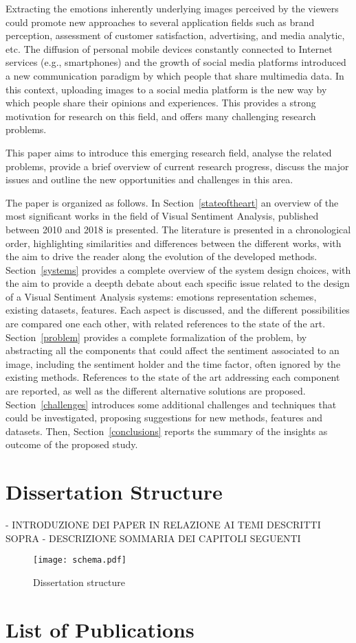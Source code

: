 Extracting the emotions inherently underlying images perceived by the viewers could promote new approaches to several application fields such as brand perception, assessment of customer satisfaction, advertising, and media analytic, etc.
The diffusion of personal mobile devices constantly connected to Internet services (e.g., smartphones) and the growth of social media platforms introduced a new communication paradigm by which people that share multimedia data. %
In this context, uploading images to a social media platform is the new way by which people share their opinions and experiences.  
This provides a strong motivation for research on this field, and offers many challenging research problems.

This paper aims to introduce this emerging research field, analyse the related problems, provide a brief overview of current research progress, discuss the major issues and outline the new opportunities and challenges in this area.


The paper is organized as follows. In Section~\ref{stateoftheart} an overview of the most significant works in the field of Visual Sentiment Analysis, published between 2010 and 2018 is presented. The literature is presented in a chronological order, highlighting similarities and differences between the different works, with the aim to drive the reader along the evolution of the developed methods.
Section~\ref{systems} provides a complete overview of the system design choices, with the aim to provide a deepth debate about each specific issue related to the design of a Visual Sentiment Analysis systems: emotions representation schemes, existing datasets, features. Each aspect is discussed, and the different possibilities are compared one each other, with related references to the state of the art.
Section~\ref{problem} provides a complete formalization of the problem, by abstracting all the components that could affect the sentiment associated to an image, including the sentiment holder and the time factor, often ignored by the existing methods. References to the state of the art addressing each component are reported, as well as the different alternative solutions are proposed.
Section~\ref{challenges} introduces some additional challenges and techniques that could be investigated, proposing suggestions for new methods, features and datasets.
Then, Section~\ref{conclusions} reports the summary of the insights as outcome of the proposed study.

\section{Dissertation Structure}
- INTRODUZIONE DEI PAPER IN RELAZIONE AI TEMI DESCRITTI SOPRA
- DESCRIZIONE SOMMARIA DEI CAPITOLI SEGUENTI
\begin{figure}[t]
	\centering
	\texttt{[image: schema.pdf]}
	\caption{Dissertation structure
	}
	\label{figDissertationSchema}
\end{figure}


\section{List of Publications}